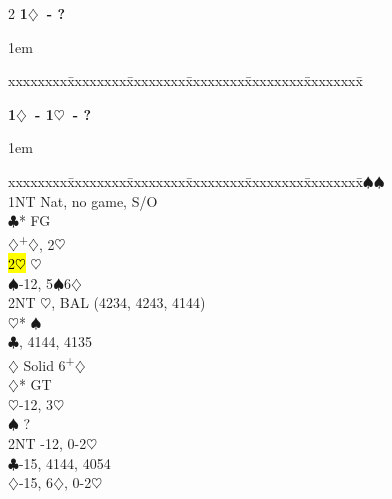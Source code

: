 \documentclass[10pt]{article}
\renewcommand{\c}{$\clubsuit$}
\renewcommand{\d}{$\diamondsuit$}
\newcommand{\h}{$\heartsuit$}
\newcommand{\s}{$\spadesuit$}
\newcommand{\p}{\textsuperscript{+}}
\newcommand{\m}{\textsuperscript{\textminus}}
\newcommand{\x}{DBL}
\newenvironment{bidtable}[1][]
{\textbf{#1}
  \begin{adjustwidth}{1em}{}
    \addvspace{2pt}
    \begin{tabbing}
      xxxxxxxx\=xxxxxxxx\=xxxxxxxx\=xxxxxxxx\=xxxxxxxx\=xxxxxxxx\=\kill}
{\end{tabbing}\end{adjustwidth}\bigskip}%
\begin{document}
\begin{multicols*}{2}
\begin{bidtable}[1\d\ - ?]
\end{bidtable}

\begin{bidtable}[1\d\ - 1\h\ - ?]
1\s             {}\s                                             \\
                \> 1NT  \> Nat, no game, S/O                       \\
                \c* \> FG                                      \\
                \>      \d      {}\p\d, 2\m\h                \\
                \>      \> \hl{2\h} \h                         \\
                \>      \s      {}-12, 5\s 6\d              \\
                \>      \> 2NT      \h, BAL (4234, 4243, 4144) \\
                \>      \>          \h* {}\s                 \\
                \>      \c      {}, 4144, 4135            \\
                \>      \d      \> Solid 6\p\d                 \\
                \d* \> GT                                      \\
                \>      \h      {}-12, 3\h                  \\
                \>      \s      \> ?                           \\
                \>      \> 2NT     -12, 0-2\h                \\
                \>      \c      {}-15, 4144, 4054           \\
                \>      \d      {}-15, 6\d, 0-2\h           \\

\end{bidtable}
\end{multicols*}
\end{document}
